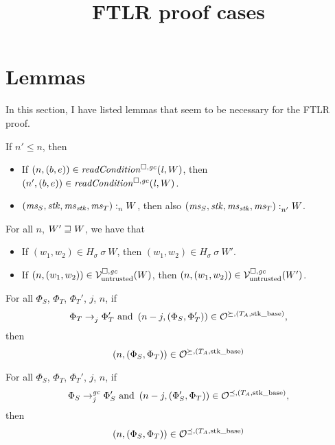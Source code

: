\documentclass[a4paper]{article}
\title{FTLR proof cases}
\begin{document}
\maketitle
\section{Lemmas}
In this section, I have listed lemmas that seem to be necessary for the FTLR proof.
\begin{lemma}
  \label{lem:non-expansive}
  If $n' \leq n$, then
  \begin{itemize}
  \item If $\npair{(b,e)} \in \readCond{\lin,W}$, then $\npair[n']{(b,e)} \in \readCond{\lin,W}$.
  \item $\memSat{(\ms_S,\stk,\ms_\stk,\ms_T)}{W}$, then also $\memSat[n']{(\ms_S,\stk,\ms_\stk,\ms_T)}{W}$.
  \end{itemize}
\end{lemma}

\begin{lemma}
  \label{lem:monotonicity}
  For all $n$, $W' \future W$, we have that
  \begin{itemize}
  \item If $(w_1,w_2) \in H_\sigma~\sigma~W$, then $(w_1,w_2) \in H_\sigma~\sigma~W'$.
  \item If $\npair{(w_1,w_2)} \in \lrv(W)$, then $\npair{(w_1,w_2)} \in
    \lrv(W')$.
\end{itemize}
\end{lemma}

\begin{lemma}
  For all $\Phi_S$, $\Phi_T$, $\Phi_T'$, $j$, $n$, if
\[
  \Phi_T \nstep[j]{} \Phi_T' \text{ and } \npair[n-j]{(\Phi_S,\Phi_T')} \in \lror,
\]
then
\[
  \npair{(\Phi_S,\Phi_T)} \in \lror
\]
\end{lemma}

\begin{lemma}
  For all $\Phi_S$, $\Phi_T$, $\Phi_T'$, $j$, $n$, if
\[
  \Phi_S \nstep[j]{\gc} \Phi_S' \text{ and } \npair[n-j]{(\Phi_S',\Phi_T)} \in \lrol,
\]
then
\[
  \npair{(\Phi_S,\Phi_T)} \in \lrol
\]
\end{lemma}
\end{document}
